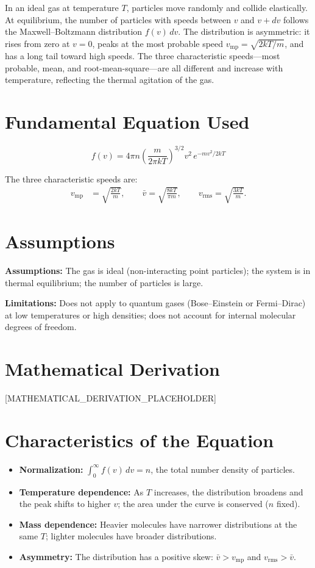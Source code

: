 \documentclass[11pt,openright]{book}
\begin{document}
In an ideal gas at temperature $T$, particles move randomly and collide elastically. At equilibrium, the number of particles with speeds between $v$ and $v + dv$ follows the Maxwell--Boltzmann distribution $f(v)\,dv$. The distribution is asymmetric: it rises from zero at $v = 0$, peaks at the most probable speed $v_{\text{mp}} = \sqrt{2kT/m}$, and has a long tail toward high speeds. The three characteristic speeds---most probable, mean, and root-mean-square---are all different and increase with temperature, reflecting the thermal agitation of the gas.
\section*{Fundamental Equation Used}

\begin{equation}
\boxed{\; f(v) = 4\pi n \left(\frac{m}{2\pi kT}\right)^{3/2} v^{2}\,e^{-mv^{2}/2kT}\;}
\label{eq:maxwell-boltzmann}
\end{equation}

The three characteristic speeds are:
\begin{align}
v_{\text{mp}} &= \sqrt{\frac{2kT}{m}}, \qquad \bar{v} = \sqrt{\frac{8kT}{\pi m}}, \qquad v_{\text{rms}} = \sqrt{\frac{3kT}{m}}.
\label{eq:mb-speeds}
\end{align}
\section*{Assumptions}

\textbf{Assumptions:} The gas is ideal (non-interacting point particles); the system is in thermal equilibrium; the number of particles is large.


\textbf{Limitations:} Does not apply to quantum gases (Bose--Einstein or Fermi--Dirac) at low temperatures or high densities; does not account for internal molecular degrees of freedom.


\section*{Mathematical Derivation}

[MATHEMATICAL_DERIVATION_PLACEHOLDER]

\section*{Characteristics of the Equation}

\begin{itemize}
  \item \textbf{Normalization:} $\int_{0}^{\infty} f(v)\,dv = n$, the total number density of particles.
  \item \textbf{Temperature dependence:} As $T$ increases, the distribution broadens and the peak shifts to higher $v$; the area under the curve is conserved ($n$ fixed).
  \item \textbf{Mass dependence:} Heavier molecules have narrower distributions at the same $T$; lighter molecules have broader distributions.
  \item \textbf{Asymmetry:} The distribution has a positive skew: $\bar{v} > v_{\text{mp}}$ and $v_{\text{rms}} > \bar{v}$.
\end{itemize}
\end{document}
